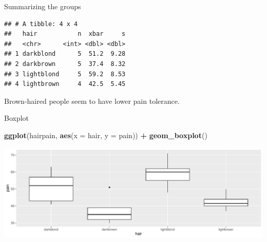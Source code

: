 \documentclass[
  ignorenonframetext,
]{beamer}
\newenvironment{Shaded}{\begin{snugshade}}{\end{snugshade}}
\newcommand{\DataTypeTok}[1]{\textcolor[rgb]{0.13,0.29,0.53}{#1}}
\newcommand{\KeywordTok}[1]{\textcolor[rgb]{0.13,0.29,0.53}{\textbf{#1}}}
\newcommand{\NormalTok}[1]{#1}
\newcommand{\OperatorTok}[1]{\textcolor[rgb]{0.81,0.36,0.00}{\textbf{#1}}}
\newcommand{\StringTok}[1]{\textcolor[rgb]{0.31,0.60,0.02}{#1}}
\begin{document}
\begin{frame}[fragile]{Summarizing the groups}
\protect\hypertarget{summarizing-the-groups}{}

\footnotesize

\begin{Shaded}
\end{Shaded}

\begin{verbatim}
## # A tibble: 4 x 4
##   hair           n  xbar     s
##   <chr>      <int> <dbl> <dbl>
## 1 darkblond      5  51.2  9.28
## 2 darkbrown      5  37.4  8.32
## 3 lightblond     5  59.2  8.53
## 4 lightbrown     4  42.5  5.45
\end{verbatim}

\normalsize

Brown-haired people seem to have lower pain tolerance.

\end{frame}

\begin{frame}[fragile]{Boxplot}
\protect\hypertarget{boxplot}{}

\begin{Shaded}
\begin{Highlighting}[]
\KeywordTok{ggplot}\NormalTok{(hairpain, }\KeywordTok{aes}\NormalTok{(}\DataTypeTok{x =}\NormalTok{ hair, }\DataTypeTok{y =}\NormalTok{ pain)) }\OperatorTok{+}\StringTok{ }\KeywordTok{geom_boxplot}\NormalTok{()}
\end{Highlighting}
\end{Shaded}

\includegraphics{slides_d29_files/figure-beamer/tartuffo-1.pdf}

\end{frame}
\end{document}
